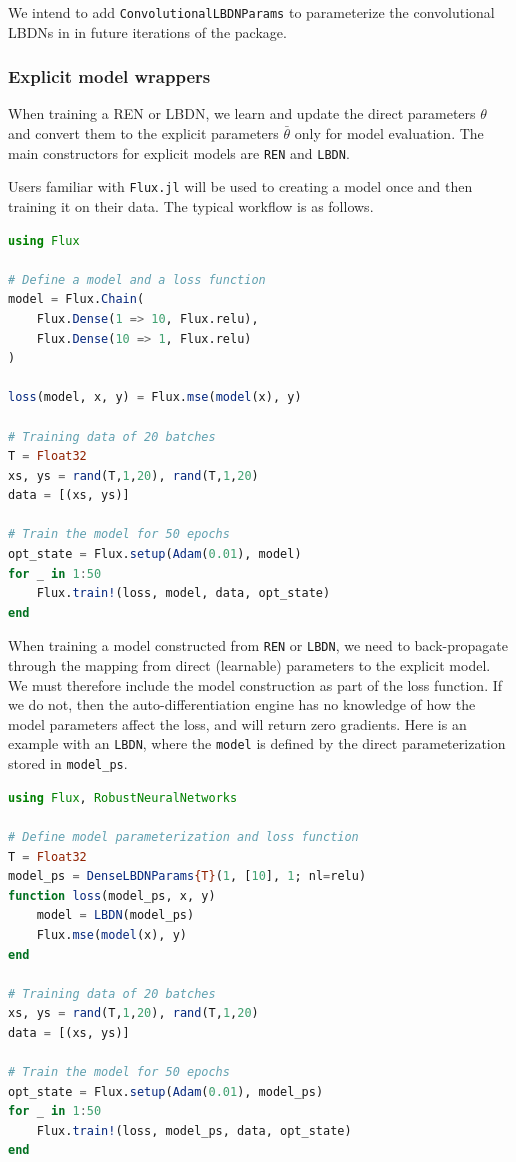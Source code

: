 We intend to add \verb|ConvolutionalLBDNParams| to parameterize the convolutional LBDNs in \cite{Wang+Manchester2023} in future iterations of the package.

\subsubsection{Explicit model wrappers} \label{sec:explicit-wrappers}

When training a REN or LBDN, we learn and update the direct parameters $\theta$ and convert them to the explicit parameters $\bar{\theta}$ only for model evaluation. The main constructors for explicit models are \verb|REN| and \verb|LBDN|.

Users familiar with \verb|Flux.jl| will be used to creating a model once and then training it on their data. The typical workflow is as follows.

\begin{lstlisting}[language = Julia]
using Flux

# Define a model and a loss function
model = Flux.Chain(
    Flux.Dense(1 => 10, Flux.relu), 
    Flux.Dense(10 => 1, Flux.relu)
)

loss(model, x, y) = Flux.mse(model(x), y)

# Training data of 20 batches
T = Float32
xs, ys = rand(T,1,20), rand(T,1,20)
data = [(xs, ys)]

# Train the model for 50 epochs
opt_state = Flux.setup(Adam(0.01), model)
for _ in 1:50
    Flux.train!(loss, model, data, opt_state)
end
\end{lstlisting}

When training a model constructed from \verb|REN| or \verb|LBDN|, we need to back-propagate through the mapping from direct (learnable) parameters to the explicit model. We must therefore include the model construction as part of the loss function. If we do not, then the auto-differentiation engine has no knowledge of how the model parameters affect the loss, and will return zero gradients. Here is an example with an \verb|LBDN|, where the \verb|model| is defined by the direct parameterization stored in \verb|model_ps|.

\begin{lstlisting}[language = Julia]
using Flux, RobustNeuralNetworks

# Define model parameterization and loss function
T = Float32
model_ps = DenseLBDNParams{T}(1, [10], 1; nl=relu)
function loss(model_ps, x, y) 
    model = LBDN(model_ps)
    Flux.mse(model(x), y)
end

# Training data of 20 batches
xs, ys = rand(T,1,20), rand(T,1,20)
data = [(xs, ys)]

# Train the model for 50 epochs
opt_state = Flux.setup(Adam(0.01), model_ps)
for _ in 1:50
    Flux.train!(loss, model_ps, data, opt_state)
end
\end{lstlisting}

